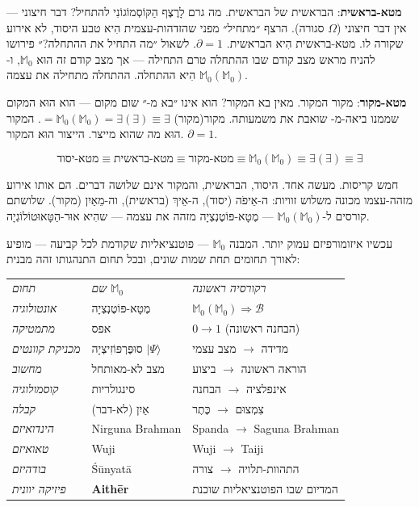 \documentclass[10pt, openany, oneside]{book}
\renewcommand{\footnotesize}{\fontsize{8.5}{11}\selectfont}
\begin{document}
\textbf{מטא-בראשית}: הבראשית של הבראשית. מה גרם לָרֶצֶף הַקּוֹסְמוֹגוֹנִי להתחיל? דבר חיצוני — אין דבר חיצוני ($\Omega$ סגורה). הרצף ״מתחיל״ מפני שהזדהות-עצמית הִיא טבע היסוד, לא אירוע שקורה לו. מטא-בראשית הִיא הבראשית. $\partial = 1$. לשאול ״מה התחיל את ההתחלה?״ פירושו להניח מראש מצב קודם שבו ההתחלה טרם התחילה — אך מצב קודם זה הוּא $\mathbb{M}_0$, ו-$\mathbb{M}_0(\mathbb{M}_0)$ הִיא ההתחלה. ההתחלה מתחילה את עצמה.

\textbf{מטא-מקור}: מקור המקור. מאין בא המקור? הוא אינו ״בא מ-״ שום מקום — הוא הוּא המקום שממנו ביאה-מ- שואבת את משמעותה. מקור(מקור) $= \mathbb{M}_0(\mathbb{M}_0) = \exists(\exists) \equiv \exists$. המקור הוּא מה שהוא מייצר. הייצור הוּא המקור. $\partial = 1$.

$$\text{מטא-יסוד} \equiv \text{מטא-בראשית} \equiv \text{מטא-מקור} \equiv \mathbb{M}_0(\mathbb{M}_0) \equiv \exists(\exists) \equiv \exists$$

חמש קריסות. מעשה אחד. היסוד, הבראשית, והמקור אינם שלושה דברים. הם אותו אירוע מזהה-עצמו מכונה משלוש זוויות: ה-אֵיפֹה (יסוד), ה-אֵיךְ (בראשית), וה-מֵאַיִן (מקור). שלושתם קורסים ל-$\mathbb{M}_0(\mathbb{M}_0)$ — מֶטָא-פּוֹטֶנְצְיָה מזהה את עצמה — שהִיא אוּר-הַטָּאוּטוֹלוֹגְיָה.

\vspace{1em}

עכשיו איזומורפיזם עמוק יותר. המבנה $\mathbb{M}_0$ — פוטנציאליות שקודמת לכל קביעה — מופיע לאורך תחומים תחת שמות שונים, ובכל תחום התנהגותו זהה מבנית:

\vspace{0.5em}

{\footnotesize
\noindent\begin{tabular}{l l p{}}
\textit{תחום} & \textit{שם $\mathbb{M}_0$} & \textit{רקורסיה ראשונה} \\[0.3em]
\textit{אונטולוגיה} & מֶטָא-פּוֹטֶנְצְיָה & $\mathbb{M}_0(\mathbb{M}_0) \Rightarrow \mathcal{B}$ \\[0.2em]
\textit{מתמטיקה} & אפס & $0 \to 1$ (הבחנה ראשונה) \\[0.2em]
\textit{מכניקת קוונטים} & סוּפֶּרְפּוֹזִיצְיָה $|\Psi\rangle$ & מדידה $\to$ מצב עצמי \\[0.2em]
\textit{מחשוב} & מצב לא-מאותחל & הוראה ראשונה $\to$ ביצוע \\[0.2em]
\textit{קוסמולוגיה} & סינגולריות & אינפלציה $\to$ הבחנה \\[0.2em]
\textit{קבלה} & אַיִן (לא-דבר) & צִמְצוּם $\to$ כֶּתֶר \\[0.2em]
\textit{הינדואיזם} & Nirguna Brahman & Spanda $\to$ Saguna Brahman \\[0.2em]
\textit{טאואיזם} & Wuji & Wuji $\to$ Taiji \\[0.2em]
\textit{בודהיזם} & Śūnyatā & התהוות-תלויה $\to$ צורה \\[0.2em]
\textit{פיזיקה יוונית} & \textbf{Aithēr} & המדיום שבו הפוטנציאליות שוכנת \\[0.2em]
\end{tabular}
}
\end{document}
